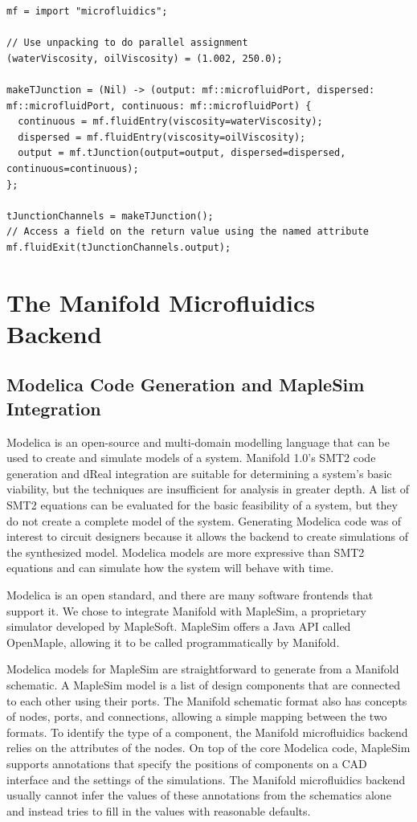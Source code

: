 \begin{lstlisting}[label=lst:unpacking, caption=Examples of new tuple features]
mf = import "microfluidics";

// Use unpacking to do parallel assignment
(waterViscosity, oilViscosity) = (1.002, 250.0);

makeTJunction = (Nil) -> (output: mf::microfluidPort, dispersed: mf::microfluidPort, continuous: mf::microfluidPort) {
  continuous = mf.fluidEntry(viscosity=waterViscosity);
  dispersed = mf.fluidEntry(viscosity=oilViscosity);
  output = mf.tJunction(output=output, dispersed=dispersed, continuous=continuous);
};

tJunctionChannels = makeTJunction();
// Access a field on the return value using the named attribute
mf.fluidExit(tJunctionChannels.output);
\end{lstlisting}

\section{The Manifold Microfluidics Backend}

\subsection{Modelica Code Generation and MapleSim Integration}

Modelica is an open-source and multi-domain modelling language that can be used
to create and simulate models of a system. \cite{Maplesim}\cite{modelica}
Manifold 1.0's SMT2 code generation and dReal integration are suitable for
determining a system's basic viability, but the techniques are insufficient for
analysis in greater depth.
A list of SMT2 equations can be evaluated for the basic feasibility of a system, but they do not create
a complete model of the system.
Generating Modelica code was of interest to circuit designers because it allows the backend to create simulations of the
synthesized model.
Modelica models are more expressive than SMT2 equations and can simulate how the system will behave with time.

Modelica is an open standard, and there are many software frontends that support it.
We chose to integrate Manifold with MapleSim, a proprietary simulator developed by MapleSoft.
MapleSim offers a Java API called OpenMaple, allowing it to be called programmatically by Manifold.

Modelica models for MapleSim are straightforward to generate from a Manifold schematic.
A MapleSim model is a list of design components that are connected to each other using their ports.
The Manifold schematic format also has concepts of nodes, ports, and connections, allowing a simple mapping
between the two formats.
To identify the type of a component, the Manifold microfluidics backend relies on the attributes of the nodes.
On top of the core Modelica code, MapleSim supports annotations that specify the positions of components on a CAD interface and the settings of the simulations.
The Manifold microfluidics backend usually cannot infer the values of these annotations from the schematics
alone and instead tries to fill in the values with reasonable defaults.


